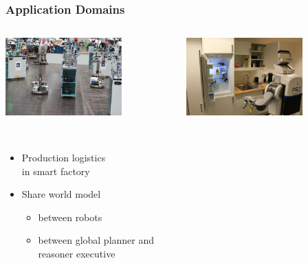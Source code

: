 \begin{frame}
  \frametitle{Application Domains}
  \begin{columns}
    \begin{column}{0.5\textwidth}
      \centering
      \includegraphics[width=0.7\textwidth]{../thesis/img/rcll-feld}
  \begin{description}[]
  \item[RoboCup Logistics League] \hfill \\
    \begin{itemize}
    \item Production logistics\\ in smart factory
    \item Share world model
    \begin{itemize}
    \item between robots
    \item between global planner and reasoner executive
    \end{itemize}
    \end{itemize}
  \end{description}
    \end{column}
    \begin{column}{0.5\textwidth}
    \centering
    \pause
    \includegraphics[width=0.7\textwidth]{../thesis/img/pr2-kbsg-kitchen}
  \begin{description}[]

\end{description}
\end{column}
\end{columns}
\end{frame}
